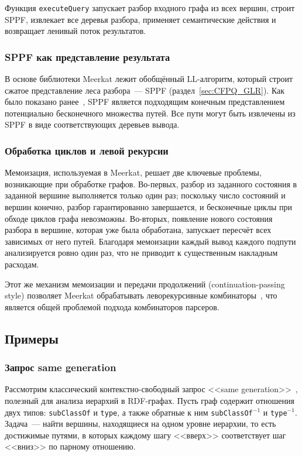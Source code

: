 Функция \texttt{executeQuery} запускает разбор входного графа из всех вершин, строит SPPF, извлекает все деревья разбора, применяет семантические действия и возвращает ленивый поток результатов.

\subsubsection{SPPF как представление результата}

В основе библиотеки Meerkat лежит обобщённый LL-алгоритм, который строит сжатое представление леса разбора~--- SPPF (раздел~\ref{sec:CFPQ_GLR}).
Как было показано ранее~, SPPF является подходящим конечным представлением потенциально бесконечного множества путей.
Все пути могут быть извлечены из SPPF в виде соответствующих деревьев вывода.

\subsubsection{Обработка циклов и левой рекурсии}

Мемоизация, используемая в Meerkat, решает две ключевые проблемы, возникающие при обработке графов.
Во-первых, разбор из заданного состояния в заданной вершине выполняется только один раз; поскольку число состояний и вершин конечно, разбор гарантированно завершается, и бесконечные циклы при обходе циклов графа невозможны.
Во-вторых, появление нового состояния разбора в вершине, которая уже была обработана, запускает пересчёт всех зависимых от него путей.
Благодаря мемоизации каждый вывод каждого подпути анализируется ровно один раз, что не приводит к существенным накладным расходам.

Этот же механизм мемоизации и передачи продолжений (continuation-passing style) позволяет Meerkat обрабатывать леворекурсивные комбинаторы~, что является общей проблемой подхода комбинаторов парсеров.

\subsection{Примеры}
\label{subsec:CFPQ_Combinators_examples}

\subsubsection{Запрос same generation}

Рассмотрим классический контекстно-свободный запрос <<same generation>>~, полезный для анализа иерархий в RDF-графах.
Пусть граф содержит отношения двух типов: \texttt{subClassOf} и \texttt{type}, а также обратные к ним \texttt{subClassOf}$^{-1}$ и \texttt{type}$^{-1}$.
Задача~--- найти вершины, находящиеся на одном уровне иерархии, то есть достижимые путями, в которых каждому шагу <<вверх>> соответствует шаг <<вниз>> по парному отношению.

